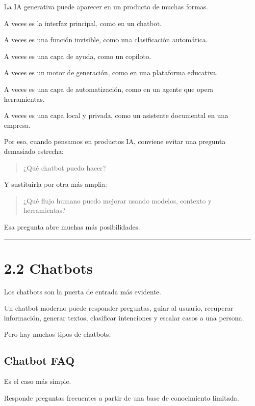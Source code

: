 La IA generativa puede aparecer en un producto de muchas formas.

A veces es la interfaz principal, como en un chatbot.

A veces es una función invisible, como una clasificación automática.

A veces es una capa de ayuda, como un copiloto.

A veces es un motor de generación, como en una plataforma educativa.

A veces es una capa de automatización, como en un agente que opera
herramientas.

A veces es una capa local y privada, como un asistente documental en una
empresa.

Por eso, cuando pensamos en productos IA, conviene evitar una pregunta
demasiado estrecha:

\begin{quote}
¿Qué chatbot puedo hacer?
\end{quote}

Y sustituirla por otra más amplia:

\begin{quote}
¿Qué flujo humano puedo mejorar usando modelos, contexto y herramientas?
\end{quote}

Esa pregunta abre muchas más posibilidades.

\begin{center}\rule{0.5\linewidth}{0.5pt}\end{center}

\section{2.2 Chatbots}\label{chatbots}

Los chatbots son la puerta de entrada más evidente.

Un chatbot moderno puede responder preguntas, guiar al usuario,
recuperar información, generar textos, clasificar intenciones y escalar
casos a una persona.

Pero hay muchos tipos de chatbots.

\subsection{Chatbot FAQ}\label{chatbot-faq}

Es el caso más simple.

Responde preguntas frecuentes a partir de una base de conocimiento
limitada.

